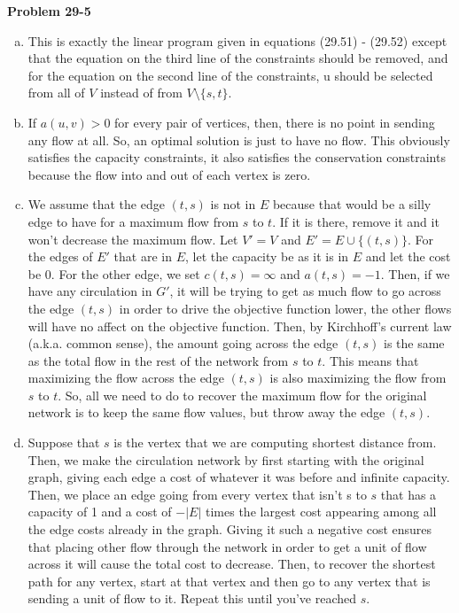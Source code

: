 \documentclass{article}
\begin{document}
\noindent\textbf{Problem 29-5}\\

\begin{enumerate}[a.]
\item
This is exactly the linear program given in equations (29.51) - (29.52) except that the equation on the third line of the constraints should be removed, and for the equation on the second line of the constraints, u should be selected from all of $V$ instead of from $V \setminus \{s,t\}$.
\item
If $a(u,v) > 0$ for every pair of vertices, then, there is no point in sending any flow at all. So, an optimal solution is just to have no flow. This obviously satisfies the capacity constraints, it also satisfies the conservation constraints because the flow into and out of each vertex is zero.
\item
We assume that the edge $(t,s)$ is not in $E$ because that would be a silly edge to have for a maximum flow from $s$ to $t$. If it is there, remove it and it won't decrease the maximum flow. Let $V' = V$ and $E' = E \cup \{(t,s)\}$. For the edges of $E'$ that are in $E$, let the capacity be as it is in $E$ and let the cost be 0. For the other edge, we set $c(t,s) = \infty$ and $a(t,s) = -1$. Then, if we have any circulation in $G'$, it will be trying to get as much flow to go across the edge $(t,s)$ in order to drive the objective function lower, the other flows will have no affect on the objective function. Then, by Kirchhoff's current law (a.k.a. common sense), the amount going across the edge $(t,s)$ is the same as the total flow in the rest of the network from $s$ to $t$. This means that maximizing the flow across the edge $(t,s)$ is also maximizing the flow from $s$ to $t$. So, all we need to do to recover the maximum flow for the original network is to keep the same flow values, but throw away the edge $(t,s)$.
\item
Suppose that $s$ is the vertex that we are computing shortest distance from. Then, we make the circulation network by first starting with the original graph, giving each edge a cost of whatever it was before and infinite capacity. Then, we place an edge going from every vertex that isn't s to $s$ that has a capacity of 1 and a cost of $-|E|$ times the largest cost appearing among all the edge costs already in the graph. Giving it such a negative cost ensures that placing other flow through the network in order to get a unit of flow across it will cause the total cost to decrease. Then, to recover the shortest path for any vertex, start at that vertex and then go to any vertex that is sending a unit of flow to it. Repeat this until you've reached $s$.
\end{enumerate}
\end{document}
